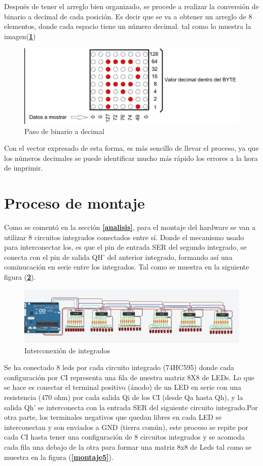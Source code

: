 \documentclass{article}
\begin{document}
Después de tener el arreglo bien organizado, se procede a realizar la conversión de binario a decimal de cada posición. Es decir que se va a obtener un arreglo de 8 elementos, donde cada espacio tiene un número decimal. tal como lo muestra la imagen(\textbf{\ref{decbin}})

    \begin{figure}[h]
    \includegraphics[width=12cm]{decbin.png}
    \centering
    \caption{Paso de binario a decimal}
    \label{decbin}
    \end{figure}
    
Con el vector expresado de esta forma, es más sencillo de llevar el proceso, ya que los números decimales se puede identificar mucho más rápido los errores a la hora de imprimir.

\section{Proceso de montaje}\label{montaje}
Como se comentó en la sección \textbf{\ref{analisis}}, para el montaje del hardware se van a utilizar 8 circuitos integrados conectados entre sí. Donde el mecanismo usado para interconectar los, es que el pin de entrada SER del segundo integrado, se conecta con el pin de  salida  QH' del anterior integrado, formando así una cominucación en serie entre los integrados. Tal como se muestra en la siguiente figura (\textbf{\ref{inter}}).

    \begin{figure}[h]
    \includegraphics[width=14cm]{inter.jpeg}
    \centering
    \caption{Interconexión de integrados}
    \label{inter}
    \end{figure}

Se ha conectado 8 leds por cada circuito integrado (74HC595) donde cada configuración por CI representa una fila de nuestra matriz 8X8 de LEDs. 
Lo que se hace es conectar el terminal positivo (ánodo) de un LED en serie con una resistencia (470 ohm) por cada salida Qi de los CI (desde Qa hasta Qh),  y la salida Qh’ se interconecta con la entrada SER del siguiente circuito integrado.Por otra parte, los terminales negativos que quedan libres en cada LED se interconectan y son enviados a GND (tierra común), este proceso se repite por cada CI  hasta tener una configuración de 8 circuitos integrados y se acomoda cada fila una debajo de la otra para formar una matriz 8x8 de Leds tal como se muestra en la figura (\textbf{\ref{montaje5}}).
\end{document}
